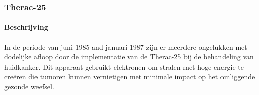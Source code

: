 \documentclass{article}
\begin{document}
	
	\subsubsection{Therac-25}
	\paragraph{Beschrijving}
	In de periode van juni 1985 and januari 1987 zijn er meerdere ongelukken met dodelijke afloop door de implementatie van de Therac-25 bij de behandeling van huidkanker.
	Dit apparaat gebruikt elektronen om stralen met hoge energie te creëren die tumoren kunnen vernietigen met minimale impact op het omliggende gezonde weefsel.
	
\end{document}
